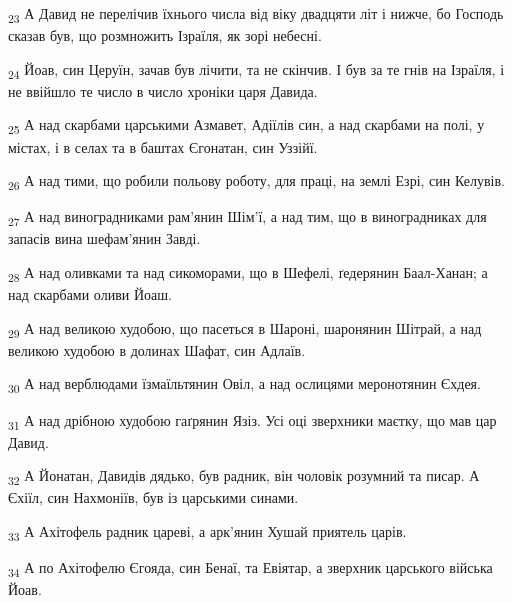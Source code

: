 \begin{tcolorbox}
\textsubscript{23} А Давид не перелічив їхнього числа від віку двадцяти літ і нижче, бо Господь сказав був, що розмножить Ізраїля, як зорі небесні.
\end{tcolorbox}
\begin{tcolorbox}
\textsubscript{24} Йоав, син Церуїн, зачав був лічити, та не скінчив. І був за те гнів на Ізраїля, і не ввійшло те число в число хроніки царя Давида.
\end{tcolorbox}
\begin{tcolorbox}
\textsubscript{25} А над скарбами царськими Азмавет, Адіїлів син, а над скарбами на полі, у містах, і в селах та в баштах Єгонатан, син Уззійї.
\end{tcolorbox}
\begin{tcolorbox}
\textsubscript{26} А над тими, що робили польову роботу, для праці, на землі Езрі, син Келувів.
\end{tcolorbox}
\begin{tcolorbox}
\textsubscript{27} А над виноградниками рам'янин Шім'ї, а над тим, що в виноградниках для запасів вина шефам'янин Завді.
\end{tcolorbox}
\begin{tcolorbox}
\textsubscript{28} А над оливками та над сикоморами, що в Шефелі, ґедерянин Баал-Ханан; а над скарбами оливи Йоаш.
\end{tcolorbox}
\begin{tcolorbox}
\textsubscript{29} А над великою худобою, що пасеться в Шароні, шаронянин Шітрай, а над великою худобою в долинах Шафат, син Адлаїв.
\end{tcolorbox}
\begin{tcolorbox}
\textsubscript{30} А над верблюдами їзмаїльтянин Овіл, а над ослицями меронотянин Єхдея.
\end{tcolorbox}
\begin{tcolorbox}
\textsubscript{31} А над дрібною худобою гаґрянин Язіз. Усі оці зверхники маєтку, що мав цар Давид.
\end{tcolorbox}
\begin{tcolorbox}
\textsubscript{32} А Йонатан, Давидів дядько, був радник, він чоловік розумний та писар. А Єхіїл, син Нахмоніїв, був із царськими синами.
\end{tcolorbox}
\begin{tcolorbox}
\textsubscript{33} А Ахітофель радник цареві, а арк'янин Хушай приятель царів.
\end{tcolorbox}
\begin{tcolorbox}
\textsubscript{34} А по Ахітофелю Єгояда, син Бенаї, та Евіятар, а зверхник царського війська Йоав.
\end{tcolorbox}
